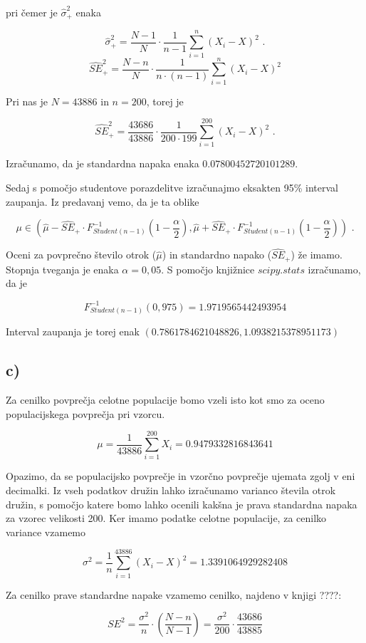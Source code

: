 \documentclass[12pt, a4paper]{article}
\begin{document}
pri čemer je $\hat{\sigma}_+^2$ enaka 

$$\hat{\sigma}_+^2 = \frac{N-1}{N} \cdot \frac{1}{n-1} \sum_{i=1}^{n} (X_i - X)^2 \text{ .} $$ $$
\hat{SE}_+^2 = \frac{N-n}{N} \cdot \frac{1}{n\cdot(n-1)} \sum_{i=1}^{n} (X_i - X)^2
$$

Pri nas je $ N = 43886 $ in $ n = 200 $, torej je

$$ \hat{SE}_+^2 = \frac{43686}{43886} \cdot \frac{1}{200\cdot199} \sum_{i=1}^{200} (X_i - X)^2 \text{ .}
$$

Izračunamo, da je standardna napaka enaka $ 0.07800452720101289 $.

Sedaj s pomočjo studentove porazdelitve izračunajmo eksakten 95\% interval zaupanja.
Iz predavanj vemo, da je ta oblike

$$ \mu \in (\hat{\mu} - \hat{SE}_+ \cdot F^{-1}_{Student(n-1)}(1-\frac{\alpha}{2}),\hat{\mu} + \hat{SE}_+ \cdot F^{-1}_{Student(n-1)}(1-\frac{\alpha}{2}) ) \text{ .}
$$

Oceni za povprečno število otrok ($\hat{\mu}$) in standardno napako ($\hat{SE}_+$)
že imamo. Stopnja tveganja je enaka $\alpha = 0,05$. S pomočjo knjižnice $scipy.stats$ izračunamo, da je 

$$ F^{-1}_{Student(n-1)}(0,975) = 1.9719565442493954
$$

Interval zaupanja je torej enak $(0.7861784621048826, 1.0938215378951173)$

\subsection{c)}

Za cenilko povprečja celotne populacije bomo vzeli isto kot smo za oceno populacijskega
povprečja pri vzorcu. 

$$ \mu = \frac{1}{43886}\sum^{200}_{i=1} X_i = 0.9479332816843641
$$

Opazimo, da se populacijsko povprečje in vzorčno povprečje ujemata zgolj v eni decimalki.
Iz vseh podatkov družin lahko izračunamo varianco števila otrok družin, s pomočjo
katere bomo lahko ocenili kakšna je prava standardna napaka za vzorec velikosti 200.
Ker imamo podatke celotne populacije, za cenilko variance vzamemo

$$ \sigma^2 = \frac{1}{n} \sum_{i=1}^{43886} (X_i - X)^2 = 1.3391064929282408
$$

Za cenilko prave standardne napake vzamemo cenilko, najdeno v knjigi ????:

$$ SE^2 = \frac{\sigma^2}{n} \cdot (\frac{N-n}{N-1}) = \frac{\sigma^2}{200} \cdot \frac{43686}{43885}
$$
\end{document}
